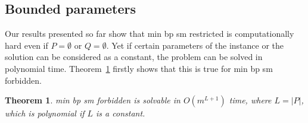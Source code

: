 \documentclass[preprint,12pt]{elsarticle}
\newtheorem{theorem}{Theorem}[section]
\begin{document}
\subsection{Bounded parameters}
\label{se:bounded_par}

Our results presented so far show that {\sc min bp sm restricted} is computationally hard even if $P=\emptyset$ or $Q=\emptyset$. Yet if certain parameters of the instance or the solution can be considered as a constant, the problem can be solved in polynomial time. Theorem~\ref{th:minbppconstant} firstly shows that this is true for {\sc min bp sm forbidden}.

\begin{theorem}
\label{th:minbppconstant}
	{\sc min bp sm forbidden} is solvable in $O(m^{L+1})$ time, where $L=|P|$, which is polynomial if $L$ is a constant.
\end{theorem}
\end{document}
